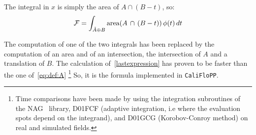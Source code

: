 The integral in $x$ is simply the area of $A\cap
\left(B-t\right)$, so:
\begin{equation}
  \label{lastexpression}
  {\cal F} = \int_{\check{A}\oplus B} \mathrm{area}(A\,\cap\,(B-t)) \,\phi(t)
  \,dt 
\end{equation}

The computation of one of the two integrals has been replaced
by the computation of an area and of an intersection, the intersection
of  $A$ and a translation of $B$.
The calculation of~\eqref{lastexpression} has
proven to be faster than the one of~\eqref{eq:def:A}
\footnote{Time comparisons have been made by using the 
integration subroutines of the NAG~\cite{NAG} library,
D01FCF (adaptive integration, i.e where the evaluation 
spots depend
on the integrand), and  D01GCG (Korobov-Conroy method) 
on  real and simulated fields.}
So, it is the formula implemented in \verb+CaliFloPP+.


